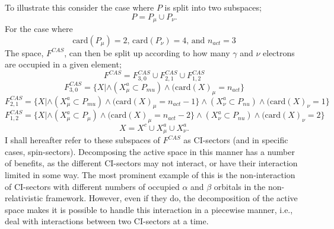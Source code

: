 \noindent To illustrate this consider the case where $P$ is split into two subspaces;
\begin{equation}
P = P_{\mu} \cup  P_{\nu}.
\end{equation}
For the case where
\begin{equation*}
\text{card}(P_{\mu}) = 2 
\text{, \ \ \ }
\text{card}(P_{\nu}) = 4
\text{, \ \ \ and \ \ \ }
n_{act} = 3
\end{equation*}
\noindent The space, $F^{CAS}$, can then be split up according to how many $\gamma$ and $\nu$
electrons are occupied in a given element;
\begin{equation*}
F^{CAS} = F^{CAS}_{3,0} \cup F^{CAS}_{2,1} \cup F^{CAS}_{1,2} 
\end{equation*}
\begin{equation*}
F^{CAS}_{3,0} = \{ X | \wedge (X^{a}_{\mu} \subset P_{mu}) \wedge ( \text{card}(X)_{\mu} = n_{act} \}
\end{equation*}
\begin{equation*}
F^{CAS}_{2,1} = \{ X | \wedge (X^{a}_{\mu} \subset P_{mu}) \wedge ( \text{card}(X)_{\mu} = n_{act}-1 \}
                       \wedge (X^{a}_{\nu} \subset P_{nu}) \wedge ( \text{card}(X)_{\nu} = 1 \}
\end{equation*}
\begin{equation*}
F^{CAS}_{1,2} = \{ X | \wedge (X^{a}_{\mu} \subset P_{\mu}) \wedge ( \text{card}(X)_{\mu} = n_{act}-2 \}
                       \wedge (X^{a}_{\nu} \subset P_{nu}) \wedge ( \text{card}(X)_{\nu} = 2 \}
\end{equation*}
\begin{equation*}
X = X^{c} \cup X^{a}_{\mu} \cup X^{a}_{\nu}.
\end{equation*}
\noindent I shall hereafter refer to these subspaces of $F^{CAS}$ as
CI-sectors (and in specific cases, spin-sectors). Decomposing the active space in
this manner has a number of benefits, as the different CI-sectors may not interact,
or have their interaction limited in some way.
The most prominent example of this is the non-interaction
of CI-sectors with different numbers of occupied $\alpha$ and $\beta$ orbitals 
in the non-relativistic framework.  However, even if they do,
the decomposition of the active space makes it is possible to handle
this interaction in a piecewise manner, i.e., deal with interactions
between two CI-sectors at a time.\\

